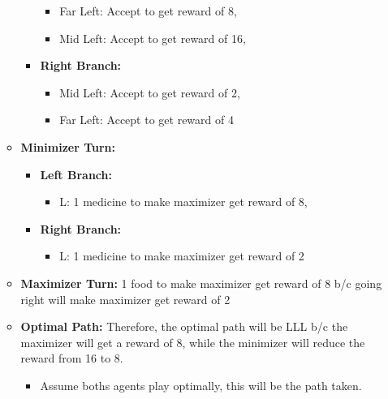 \begin{example}
\begin{itemize}
\begin{itemize}
\begin{itemize}
\begin{itemize}
                    \item Far Left: Accept to get reward of 8, 
                    \item Mid Left: Accept to get reward of 16, 
                \end{itemize}
                \item \textbf{Right Branch:}
                \begin{itemize}
                    \item Mid Left: Accept to get reward of 2, 
                    \item Far Left: Accept to get reward of 4
                \end{itemize}
            \end{itemize}
            \item \textbf{Minimizer Turn:} 
            \begin{itemize}
                \item \textbf{Left Branch:}
                \begin{itemize}
                    \item L: 1 medicine to make maximizer get reward of 8, 
                \end{itemize}
                \item \textbf{Right Branch:}
                \begin{itemize}
                    \item L: 1 medicine to make maximizer get reward of 2
                \end{itemize}
            \end{itemize}
            \item \textbf{Maximizer Turn:} 1 food to make maximizer get reward of 8 b/c going right will make maximizer get reward of 2
            \item \textbf{Optimal Path:} Therefore, the optimal path will be LLL b/c the maximizer will get a reward of 8, while the minimizer will reduce the reward from 16 to 8.
            \begin{itemize}
                \item Assume boths agents play optimally, this will be the path taken. 
            \end{itemize}
        \end{itemize}
    \end{itemize}
\end{example}
\newpage

